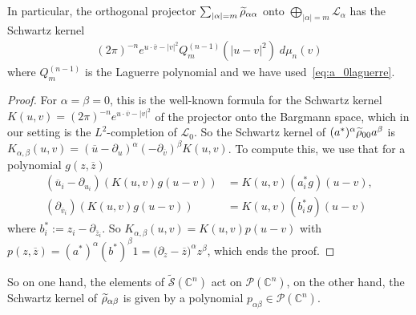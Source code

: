 \documentclass[10pt,a4paper]{article}
\theoremstyle{definition}
\numberwithin{equation}{section}
\newcommand{\C}{{\mathbb{C}}}
\newcommand{\be}{{\beta}}
\newcommand{\al}{{\alpha}}
\newcommand{\con}{\overline}
\newcommand{\symb}{\mathcal{S}}
\newcommand{\lag}{\mathcal{L}}
\newcommand{\pol}{\mathcal{P}}
\newcommand{\Vvv}{\tilde \rho}
\newcommand{\Ppp}{p}
\let\oldtilde\tilde
\renewcommand*{\tilde}[1]{\mathchoice{\widetilde{#1}}{\widetilde{#1}}{\oldtilde{#1}}{\oldtilde{#1}}}
\begin{document}
In particular, the orthogonal projector $\sum_{|\al| = m } \tilde{\rho} _{\al
\al}$ onto $\bigoplus_{|\al| = m} \lag_{\al}$ has the Schwartz kernel
\begin{gather}\label{eq:noyau_niveau_m}
(2 \pi)^{-n} e^{u \cdot \con{v} - | v |^2 } Q_m ^{(n-1)} \left(| u - v |^2\right) \; d \mu_n (v)
\end{gather}
where $Q_m^{(n-1)}$ is the Laguerre polynomial and we have used~\eqref{eq:a_0laguerre}.
\begin{proof}
For $\al = \be =0$, this is the well-known formula for the Schwartz kernel $K (u,v) = (2\pi)^{-n} e^{u \cdot \con v - |v|^2} $ of the projector onto the Bargmann space, which in our setting is the $L^2$-completion of $\lag_0$. So the Schwartz kernel of $(a^{*})^{\al} \Vvv_{00} a^{\be}$ is $ K_{\al,\be} (u,v) = (\con{u} -\partial_u)^{\al} (-\partial_{\con{v}})^{\be} K(u,v)$. To compute this, we use that for a polynomial $g (z,\con{z})$
\begin{align*}
(\con{u}_i - \partial_{u_i}) (K(u,v) g(u-v)) & = K(u,v) (a_i^{*} g)(u-v), \\
(\partial_{\con{v}_i}) (K(u,v) g(u-v)) & = K(u,v) (b_i^{*} g)(u-v)
\end{align*}
where $b_i^{*} := z_i - \partial_{\con{z}_i}$. So $K_{\al,\be} (u,v) = K(u,v) p(u-v) $ with $p (z,\con z) = (a^{*})^{\al} (b^{*})^\beta 1= \bigl(
\partial_z - \con{z})^{\al} z^\be $, which ends the proof.
\end{proof}

So on one hand, the elements of $\widetilde{\symb} (\C^n)$ act on $\pol (\C^n)$, on the other hand, the Schwartz kernel of $\Vvv_{\al\be}$ is given by a polynomial $\Ppp_{\al\be} \in \pol (\C^n)$.
\end{document}
